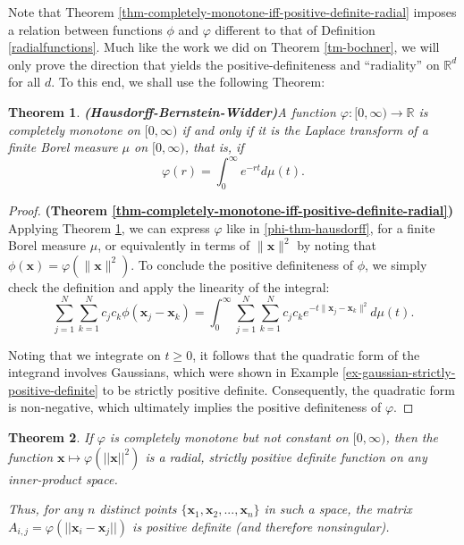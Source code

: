 \documentclass[12pt]{report} %
\newtheorem{theorem}{Theorem}
\newcommand{\tmmathbf}[1]{\ensuremath{\boldsymbol{#1}}}
\newcommand{\tmstrong}[1]{\textbf{#1}}
\begin{document}
Note that Theorem \ref{thm-completely-monotone-iff-positive-definite-radial}
imposes a relation between functions $\phi$ and $\varphi$ different to that of
Definition \ref{radialfunctions}. Much like the work we did on Theorem
\ref{tm-bochner}, we will only prove the direction that yields the
positive-definiteness and ``radiality'' on $\mathbb{R}^d$ for all $d$. To this
end, we shall use the following Theorem:

\begin{theorem}
  {\tmstrong{(Hausdorff-Bernstein-Widder)}}\label{thm-hausdorff-bernstein-widder}
  A function $\varphi : [0, \infty) \rightarrow \mathbb{R}$ is completely
  monotone on $[0, \infty)$ if and only if it is the Laplace transform of a
  finite  Borel measure $\mu$ on $[0, \infty)$, that is, if
  \begin{equation}
    \varphi (r) = \int_0^{\infty} e^{- r t} d \mu (t) .
    \label{phi-thm-hausdorff}
  \end{equation}
\end{theorem}

\begin{proof}
  {\tmstrong{(Theorem
  \ref{thm-completely-monotone-iff-positive-definite-radial})}} Applying
  Theorem \ref{thm-hausdorff-bernstein-widder}, we can express $\varphi$ like
  in \eqref{phi-thm-hausdorff}, for a finite Borel measure $\mu$,
  or equivalently in terms of $\| \tmmathbf{x} \|^2$ by noting that $\phi
  (\tmmathbf{x}) = \varphi (\| \tmmathbf{x} \|^2)$. To conclude the positive
  definiteness of $\phi$, we simply check the definition and apply the
  linearity of the integral:
  \begin{equation}\label{eqn-linearity-of-integral}
    \sum_{j = 1}^N \sum_{k = 1}^N c_j c_k \phi (\tmmathbf{x}_j
     -\tmmathbf{x}_k) = \int_0^{\infty} \sum_{j = 1}^N \sum_{k = 1}^N c_j c_k
     e^{- t \| \tmmathbf{x}_j -\tmmathbf{x}_k \|^2} d \mu (t) .
  \end{equation}
  
  Noting that we integrate on $t \geq 0$, it follows that the quadratic form of
  the integrand involves Gaussians, which were shown in Example
  \ref{ex-gaussian-strictly-positive-definite} to be strictly positive
  definite. Consequently, the quadratic form is non-negative, which ultimately
  implies the positive definiteness of $\varphi$.
\end{proof}

\begin{theorem}
  If $\varphi$ is completely monotone but not constant on $[0,\infty)$,
  then the function ${\tmmathbf{x}} \mapsto \varphi(||\tmmathbf{x}||^2)$ is a radial,
  strictly positive definite function on any inner-product space.

  Thus, for any $n$ distinct points
   $\{\tmmathbf{x}_1,\tmmathbf{x}_2,...,\tmmathbf{x}_n\}$ 
   in such a space, the matrix 
  $A_{i,j}=\varphi(||\tmmathbf{x}_i-\tmmathbf{x}_j||)$ is positive definite
  (and therefore nonsingular).
\end{theorem}
\end{document}
